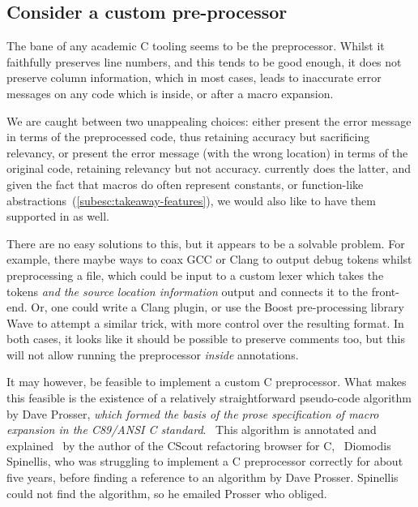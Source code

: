 \subsection{Consider a custom pre-processor}

The bane of any academic C tooling seems to be the preprocessor. Whilst it
faithfully preserves line numbers, and this tends to be good enough, it does
not preserve column information, which in most cases, leads to inaccurate error
messages on any code which is inside, or after a macro expansion.

We are caught between two unappealing choices: either present the error message
in terms of the preprocessed code, thus retaining accuracy but sacrificing
relevancy, or present the error message (with the wrong location) in terms of
the original code, retaining relevancy but not accuracy.  currently does
the latter, and given the fact that macros do often represent constants, or
function-like abstractions~(\cref{subesc:takeaway-features}), we would also
like to have them supported in  as well.

There are no easy solutions to this, but it appears to be a solvable problem. For
example, there maybe ways to coax GCC or Clang to output debug tokens whilst
preprocessing a file, which could be input to a custom lexer which takes the
tokens \emph{and the source location information} output and connects it to the
 front-end. Or, one could write a Clang plugin, or use the Boost
pre-processing library Wave to attempt a similar trick, with more control over
the resulting format. In both cases, it looks like it should be possible to
preserve comments too, but this will not allow running the preprocessor
\emph{inside}  annotations.

It may however, be feasible to implement a custom C preprocessor. What makes
this feasible is the existence of a relatively straightforward pseudo-code
algorithm by Dave Prosser, \emph{which formed the basis of the prose
    specification of macro expansion in the C89/ANSI C
standard}.~ This algorithm is annotated and
explained~ by the author of the CScout
refactoring browser for C,~ Diomodis
Spinellis, who was struggling to implement a C preprocessor correctly for about
five years, before finding a reference to an algorithm by Dave Prosser.
Spinellis could not find the algorithm, so he emailed Prosser who
obliged.

